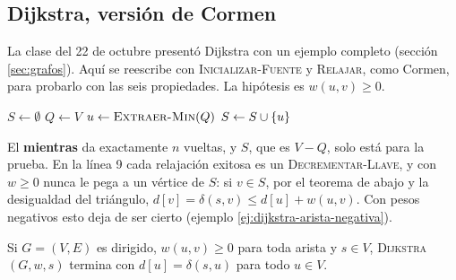 \documentclass[11pt,letterpaper]{article}
\begin{document}

\subsection*{Dijkstra, versión de Cormen}

La clase del 22 de octubre presentó Dijkstra con un ejemplo completo
(sección \ref{sec:grafos}). Aquí se reescribe con
\textsc{Inicializar-Fuente} y \textsc{Relajar}, como Cormen, para
probarlo con las seis propiedades. La hipótesis es $w(u, v) \ge 0$.

\begin{algorithm}[H]
\caption{\textsc{Dijkstra}$(G, w, s)$, versión de Cormen}
\label{alg:dijkstra-cormen}
\begin{algorithmic}[1]
  \State {}
  \State $S \gets \emptyset$
  \State $Q \gets V$ 
    \State $u \gets \Call{Extraer-Min}{Q}$
    \State $S \gets S \cup \left\{ u \right\}$ 
      \State {} 
    \EndFor
  \EndWhile
\EndProcedure
\end{algorithmic}
\end{algorithm}

El \textbf{mientras} da exactamente $n$ vueltas, y $S$, que es
$V - Q$, solo está para la prueba. En la línea 9 cada relajación
exitosa es un \textsc{Decrementar-Llave}, y con $w \ge 0$ nunca le pega
a un vértice de $S$: si $v \in S$, por el teorema de abajo y la
desigualdad del triángulo, $d[v] = \delta(s, v) \le d[u] + w(u, v)$.
Con pesos negativos esto deja de ser cierto (ejemplo
\ref{ej:dijkstra-arista-negativa}).

\begin{teorema}
  \label{teo:dijkstra-correccion}
  Si $G = (V, E)$ es dirigido, $w(u, v) \ge 0$ para toda arista y
  $s \in V$, \textsc{Dijkstra}$(G, w, s)$ termina con
  $d[u] = \delta(s, u)$ para todo $u \in V$.
\end{teorema}
\end{document}
